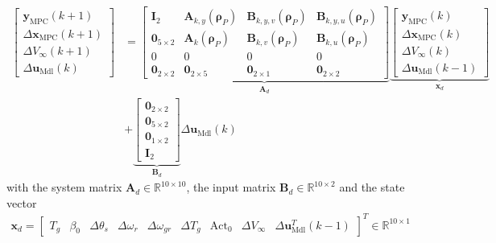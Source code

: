 \begin{equation} \label{eq:AugmentedStateSpace}
    \begin{aligned}
        \begin{bmatrix}
            \bm{y}_{\text{MPC}}(k+1)  \\
            \Delta \bm{x}_{\text{MPC}}(k+1) \\
            \Delta V_{\infty}(k+1) \\
            \Delta \bm{u}_{\text{Mdl}}(k)
        \end{bmatrix}
        &=
        \underbrace{\begin{bmatrix}
                \bm{I}_{2} & \bm{A}_{k,y}(\bm{\rho}_P)  &  \bm{B}_{k,y,v}(\bm{\rho}_P) & \bm{B}_{k,y,u}(\bm{\rho}_P)\\
                \bm{0}_{5\times2} & \bm{A}_k(\bm{\rho}_P) & \bm{B}_{k,v}(\bm{\rho}_P) & \bm{B}_{k,u}(\bm{\rho}_P)\\
                0 & 0 & 0 & 0\\
                \bm{0}_{2\times2} & \bm{0}_{2\times5} & \bm{0}_{2\times1} & \bm{0}_{2\times2}
        \end{bmatrix}}_{\bm{A}_d}
        \underbrace{\begin{bmatrix}
                \bm{y}_{\text{MPC}}(k) \\
                \Delta \bm{x}_{\text{MPC}}(k) \\
                \Delta V_{\infty}(k) \\
                \Delta \bm{u}_{\text{Mdl}}(k-1)
        \end{bmatrix}}_{\bm{x}_d} \\
        &+
        \underbrace{
            \begin{bmatrix}
                \bm{0}_{2\times2} \\
                \bm{0}_{5\times2} \\
                \bm{0}_{1\times2} \\
                \bm{I}_{2}
        \end{bmatrix}}_{\bm{B}_d}\Delta \bm{u}_{\text{Mdl}}(k)
    \end{aligned}
\end{equation}
with the system matrix $\bm{A}_d \in \mathbb{R}^{10 \times 10}$, the input matrix $\bm{B}_d \in \mathbb{R}^{10 \times 2}$ and the state vector
\begin{align}\label{eq:AugmentedStateVector} %
    \bm{x}_d = \begin{bmatrix}T_g & \beta_0 & \Delta \theta_s  & \Delta \omega_r & \Delta \omega_{gr} & \Delta T_g & \text{Act}_0 &  \Delta V_{\infty} & \Delta \bm{u}^T_{\text{Mdl}}(k-1) \end{bmatrix}^T  \in \mathbb{R}^{10 \times 1}
\end{align}
\\

